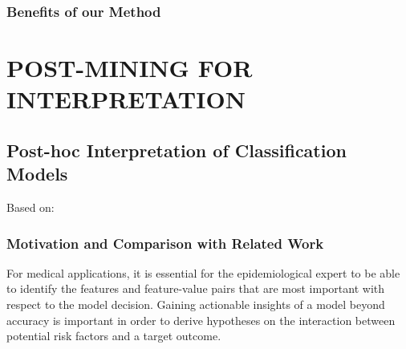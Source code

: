 \documentclass[
]{book}
\begin{document}
\hypertarget{benefits-of-our-method-2}{%
\section{Benefits of our Method}\label{benefits-of-our-method-2}}

\hypertarget{part-post-mining-for-interpretation}{%
\part{POST-MINING FOR INTERPRETATION}\label{part-post-mining-for-interpretation}}

\hypertarget{iml}{%
\chapter{Post-hoc Interpretation of Classification Models}\label{iml}}

Based on: \autocite{Niemann:CBMS2018,Niemann:SREP2020,Niemann:PONE2020,Niemann:Frontiers2020}

\hypertarget{motivation-and-comparison-with-related-work-4}{%
\section{Motivation and Comparison with Related Work}\label{motivation-and-comparison-with-related-work-4}}

For medical applications, it is essential for the epidemiological expert to be able to identify the features and feature-value pairs that are most important with respect to the model decision.
Gaining actionable insights of a model beyond accuracy is important in order to derive hypotheses on the interaction between potential risk factors and a target outcome.
\end{document}
